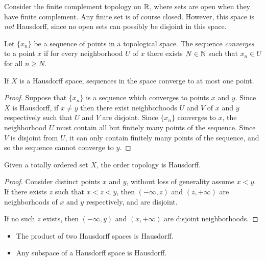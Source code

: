 \begin{exmp}
    Consider the finite complement topology on $\mathbb{R}$, where sets are open when they have finite complement. Any finite set is of course closed. However, this space is \emph{not} Hausdorff, since no open sets can possibly be disjoint in this space.
\end{exmp}

\begin{defn}
    Let $\{x_n\}$ be a sequence of points in a topological space. The sequence \emph{converges} to a point $x$ if for every neighborhood $U$ of $x$ there exists $N \in \mathbb{N}$ such that $x_n \in U$ for all $n \geq N$.
\end{defn}

\begin{lemma}
    If $X$ is a Hausdorff space, sequences in the space converge to at most one point.
\end{lemma}

\begin{proof}
    Suppose that $\{x_n\}$ is a sequence which converges to points $x$ and $y$. Since $X$ is Hausdorff, if $x \neq y$ then there exist neighborhoods $U$ and $V$ of $x$ and $y$ respectively such that $U$ and $V$ are disjoint. Since $\{x_n\}$ converges to $x$, the neighborhood $U$ must contain all but finitely many points of the sequence. Since $V$ is disjoint from $U$, it can only contain finitely many points of the sequence, and so the sequence cannot converge to $y$.
\end{proof}

\begin{lemma}
    Given a totally ordered set $X$, the order topology is Hausdorff.
\end{lemma}

\begin{proof}
    Consider distinct points $x$ and $y$, without loss of generality assume $x < y$. If there exists $z$ such that $x < z < y$, then $(-\infty, z)$ and $(z, +\infty)$ are neighborhoods of $x$ and $y$ respectively, and are disjoint.

    If no such $z$ exists, then $(-\infty, y)$ and $(x, +\infty)$ are disjoint neighborhoods.
\end{proof}

\begin{thm}\proofbreak
    \begin{itemize}
        \item The product of two Hausdorff spaces is Hausdorff.
        \item Any subspace of a Hausdorff space is Hausdorff.
    \end{itemize}
\end{thm}

